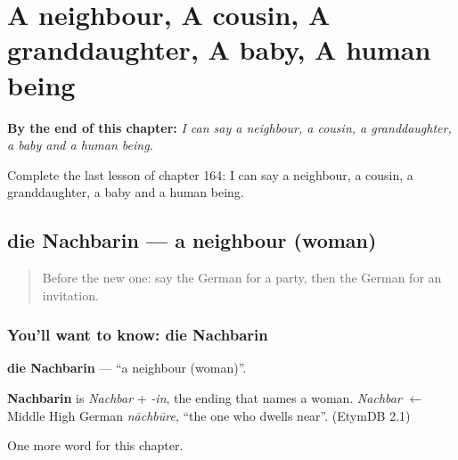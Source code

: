 
\chapter{A neighbour, A cousin, A granddaughter, A baby, A human being}
\label{ch:ge-a-neighbour-a-cousin-a-granddaughter-a-baby-a-human-being}

\begin{chapteropening}
\textbf{By the end of this chapter:} \emph{I can say a neighbour, a cousin, a granddaughter, a baby and a human being.}

Complete the last lesson of chapter 164: I can say a neighbour, a cousin, a granddaughter, a baby and a human being.
\end{chapteropening}

\section[die Nachbarin]{die Nachbarin — a neighbour (woman)}

\label{lesson:GE-C164-nachbarin}



\begin{quote}
Before the new one: say the German for a party, then the German for an invitation.
\end{quote}

\subsection*{You'll want to know: die Nachbarin}
\textbf{die Nachbarin} — \textquotedblleft{}a neighbour (woman)\textquotedblright{}.

\begin{cousinweb}
\textbf{Nachbarin} is \emph{Nachbar} + \emph{-in}, the ending that names a woman. \emph{Nachbar} $\leftarrow$ Middle High German \emph{nāchbūre}, \textquotedblleft{}the one who dwells near\textquotedblright{}. (EtymDB 2.1)
\end{cousinweb}

\begin{grammarlens}[title={What you've built}]
One more word for this chapter.
\end{grammarlens}

